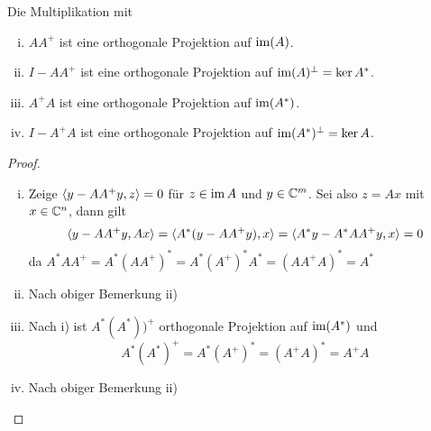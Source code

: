 \documentclass[
]{mycourse}
\begin{document}
\begin{lem}
	\label{1.42}
	Die Multiplikation mit
	\begin{enumerate}[i)]
		\item
			$AA^+$ ist eine orthogonale Projektion auf $\operatorname{im}(A)$.
		\item
			$I-AA^+$ ist eine orthogonale Projektion auf $\operatorname{im} (A)^\perp = \ker A^*$.
		\item
			$A^+A$ ist eine orthogonale Projektion auf $\operatorname{im}(A^*)$.
		\item
			$I-A^+A$ ist eine orthogonale Projektion auf $\operatorname{im} (A^*)^\perp = \ker A$.
	\end{enumerate}
	\begin{proof}
		\begin{enumerate}[i)]
			\item
				Zeige $\langle y-AA^+y, z\rangle = 0$ für $z\in \operatorname{im} A$ und $y\in \mathbb{C}^m$.
				Sei also $z=Ax$ mit $x\in \mathbb{C}^n$, dann gilt
				\[
					\langle y-AA^+y,Ax\rangle = \langle A^*(y-AA^+y),x\rangle = \langle A^*y - A^*AA^+y,x\rangle = 0
				\]
				da $A^*AA^+ = A^*(AA^+)^* = A^*(A^+)^* A^* = (AA^+A)^* = A^*$
			\item
				Nach obiger Bemerkung ii)
			\item
				Nach i) ist $A^*(A^*))^+$ orthogonale Projektion auf $\operatorname{im} (A^*)$ und
				\[
					A^*(A^*)^+ = A^*(A^+)^* = (A^+A)^* = A^+A
				\]
			\item
				Nach obiger Bemerkung ii)
		\end{enumerate}
	\end{proof}
\end{lem}
\end{document}
